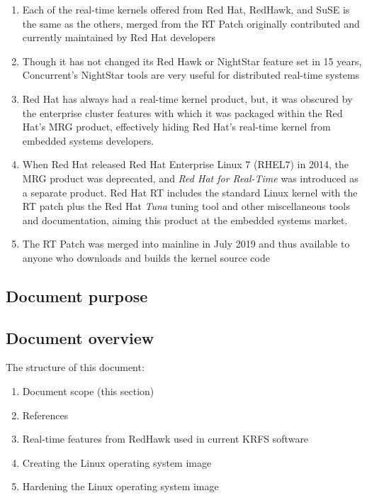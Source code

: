 \documentclass[12pt]{article}
\begin{document}
\begin{enumerate}
    \item Each of the real-time kernels offered from Red Hat, RedHawk, and SuSE
is the same as the others, merged from the RT Patch originally contributed and
currently maintained by Red Hat developers
    \item Though it has not changed its Red Hawk or NightStar feature set in 15
years, Concurrent's NightStar tools are very useful for distributed real-time
systems
    \item Red Hat has always had a real-time kernel product, but, it was
obscured by the enterprise cluster features with which it was packaged within
the Red Hat's MRG product, effectively hiding Red Hat's real-time kernel from
embedded systems developers.
    \item When Red Hat released Red Hat Enterprise Linux 7 (RHEL7) in 2014, the
MRG product was deprecated, and \emph{Red Hat for Real-Time} was introduced as a
separate product.  Red Hat RT includes the standard Linux kernel with the RT
patch plus the Red Hat \emph{Tuna} tuning tool and other miscellaneous tools and
documentation, aiming this product at the embedded systems market.
    \item The RT Patch was merged into mainline in July 2019 and thus available
to anyone who downloads and builds the kernel source code
\end{enumerate}



\subsection{Document purpose}
%


\subsection{Document overview}
The structure of this document:

\begin{enumerate}
    \item Document scope (this section)
    \item References
    \item Real-time features from RedHawk used in current KRFS software
    \item Creating the Linux operating system image
    \item Hardening the Linux operating system image
\end{enumerate}
\end{document}

